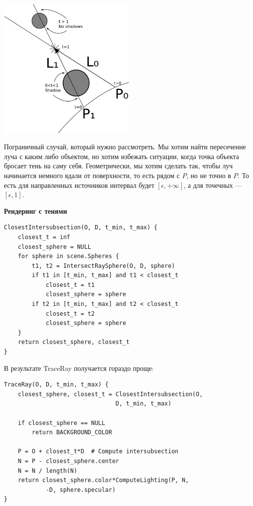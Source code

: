 \includegraphics[width=6.8cm, height=7cm]{shadows3.png}

Пограничный случай, который нужно рассмотреть.
Мы хотим найти пересечение луча с каким либо объектом, но хотим избежать ситуации, когда точка объекта бросает тень на саму себя.
Геометрически, мы хотим сделать так, чтобы луч начинается немного вдали от поверхности, то есть рядом с $P$, но не точно в $P$. То есть для направленных источников интервал будет $[\epsilon, +\infty]$, а для точечных — $[\epsilon, 1]$.

\textbf{Рендеринг с тенями}

\begin{lstlisting}
ClosestIntersubsection(O, D, t_min, t_max) {
    closest_t = inf
    closest_sphere = NULL
    for sphere in scene.Spheres {
        t1, t2 = IntersectRaySphere(O, D, sphere)
        if t1 in [t_min, t_max] and t1 < closest_t
            closest_t = t1
            closest_sphere = sphere
        if t2 in [t_min, t_max] and t2 < closest_t
            closest_t = t2
            closest_sphere = sphere
    }
    return closest_sphere, closest_t
}
\end{lstlisting}

В результате TraceRay получается гораздо проще:

\begin{lstlisting}
TraceRay(O, D, t_min, t_max) {
    closest_sphere, closest_t = ClosestIntersubsection(O, 
                                D, t_min, t_max)

    if closest_sphere == NULL
        return BACKGROUND_COLOR

    P = O + closest_t*D  # Compute intersubsection
    N = P - closest_sphere.center  
    N = N / length(N)
    return closest_sphere.color*ComputeLighting(P, N, 
            -D, sphere.specular)
}
\end{lstlisting}

